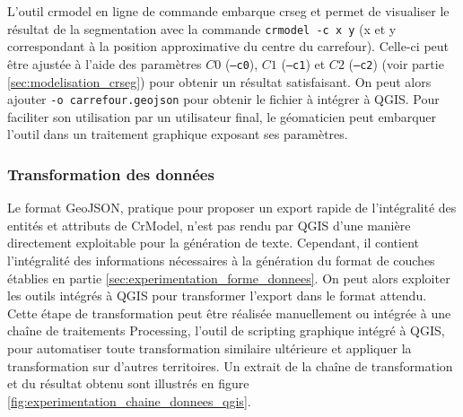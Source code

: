 \newpar{}

L'outil crmodel en ligne de commande embarque crseg et permet de visualiser le résultat de la segmentation avec la commande \texttt{crmodel -c x y} (x et y correspondant à la position approximative du centre du carrefour). Celle-ci peut être ajustée à l'aide des paramètres $C0$ (\texttt{--c0}), $C1$ (\texttt{--c1}) et $C2$ (\texttt{--c2}) (voir partie \ref{sec:modelisation_crseg}) pour obtenir un résultat satisfaisant. On peut alors ajouter \texttt{-o carrefour.geojson} pour obtenir le fichier à intégrer à QGIS. Pour faciliter son utilisation par un utilisateur final, le géomaticien peut embarquer l'outil dans un traitement graphique exposant ses paramètres.

\subsubsection{Transformation des données}

Le format GeoJSON, pratique pour proposer un export rapide de l'intégralité des entités et attributs de CrModel, n'est pas rendu par QGIS d'une manière directement exploitable pour la génération de texte. Cependant, il contient l'intégralité des informations nécessaires à la génération du format de couches établies en partie \ref{sec:experimentation_forme_donnees}. On peut alors exploiter les outils intégrés à QGIS pour transformer l'export dans le format attendu. Cette étape de transformation peut être réalisée manuellement ou intégrée à une chaîne de traitements Processing, l'outil de scripting graphique intégré à QGIS, pour automatiser toute transformation similaire ultérieure et appliquer la transformation sur d'autres territoires. Un extrait de la chaîne de transformation et du résultat obtenu sont illustrés en figure \ref{fig:experimentation_chaine_donnees_qgis}.

